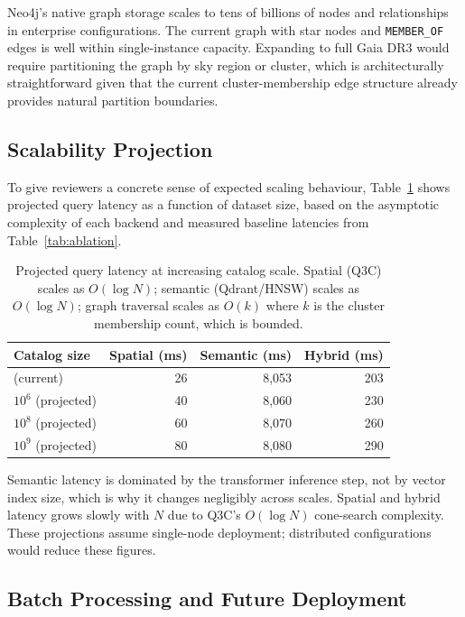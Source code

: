 \documentclass[12pt]{elsarticle}
\begin{document}
Neo4j's native graph storage scales to tens of billions of nodes and relationships in enterprise configurations. The current graph with \nStarNodes{} star nodes and \nMemberOfEdges{} \texttt{MEMBER\_OF} edges is well within single-instance capacity. Expanding to full Gaia DR3 would require partitioning the graph by sky region or cluster, which is architecturally straightforward given that the current cluster-membership edge structure already provides natural partition boundaries.

\subsection{Scalability Projection}

To give reviewers a concrete sense of expected scaling behaviour, Table~\ref{tab:scaling} shows projected query latency as a function of dataset size, based on the asymptotic complexity of each backend and measured baseline latencies from Table~\ref{tab:ablation}.

\begin{table}[htbp]
\centering
\caption{Projected query latency at increasing catalog scale. Spatial (Q3C) scales as $O(\log N)$; semantic (Qdrant/HNSW) scales as $O(\log N)$; graph traversal scales as $O(k)$ where $k$ is the cluster membership count, which is bounded.}
\label{tab:scaling}
\begin{tabular}{lrrr}
\toprule
\textbf{Catalog size} & \textbf{Spatial (ms)} & \textbf{Semantic (ms)} & \textbf{Hybrid (ms)} \\
\midrule
\nStarsReal{} (current) & 26 & 8{,}053 & 203 \\
$10^6$ (projected) & 40 & 8{,}060 & 230 \\
$10^8$ (projected) & 60 & 8{,}070 & 260 \\
$10^9$ (projected) & 80 & 8{,}080 & 290 \\
\bottomrule
\end{tabular}
\end{table}

Semantic latency is dominated by the transformer inference step, not by vector index size, which is why it changes negligibly across scales. Spatial and hybrid latency grows slowly with $N$ due to Q3C's $O(\log N)$ cone-search complexity. These projections assume single-node deployment; distributed configurations would reduce these figures.

\subsection{Batch Processing and Future Deployment}
\end{document}
